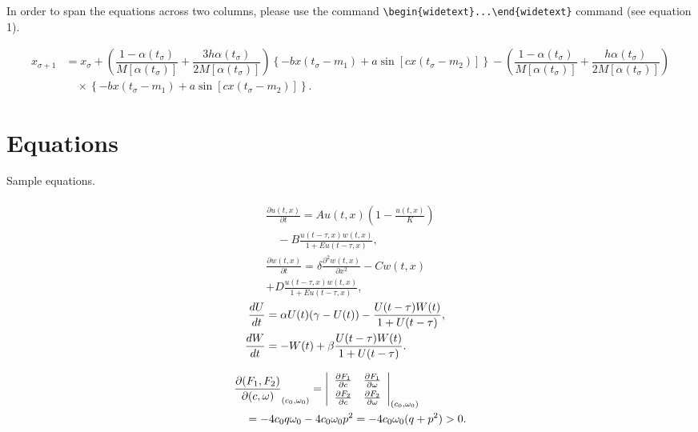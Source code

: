 \documentclass[vruler,JEB]{COB}%
\begin{document}
In order to span the equations across two columns, please use the command
\verb+\begin{widetext}...\end{widetext}+ command (see equation 1).

\begin{widetext}
\begin{align} \label{d24} x_{\sigma+1} &= x_{\sigma} + \left( \dfrac{1-\alpha(t_\sigma)}{M[\alpha(t_\sigma)]} + \dfrac{3h\alpha(t_\sigma)}{2M[\alpha(t_\sigma)]} \right)  \left\{-bx(t_\sigma-m_1) + a \sin [cx(t_\sigma-m_2)]\right\}  - \left( \dfrac{1-\alpha(t_\sigma)}{M[\alpha(t_\sigma)]} + \dfrac{h \alpha(t_\sigma)}{2M[\alpha(t_\sigma)]}\right)\nonumber\\ &\quad\times \left\{-bx(t_\sigma-m_1) + a \sin [cx(t_\sigma-m_2)]\right\}. \end{align}
\end{widetext}


\section{Equations}

Sample equations.

\begin{align}\label{1.1}
\begin{split}
\frac{\partial u(t,x)}{\partial t} = Au(t,x) \left(1-\frac{u(t,x)}{K}\right)\\
\quad -B\frac{u(t-\tau,x) w(t,x)}{1+Eu(t-\tau,x)},\\
\frac{\partial w(t,x)}{\partial t} =\delta \frac{\partial^2w(t,x)}{\partial x^2}-Cw(t,x)\\
+D\frac{u(t-\tau,x)w(t,x)}{1+Eu(t-\tau,x)},
\end{split}
\end{align}


\begin{align}\label{1.2}
\begin{split}
\notag\\[-26pt]\frac{dU}{dt} &=\alpha U(t)(\gamma -U(t))-\frac{U(t-\tau)W(t)}{1+U(t-\tau)},\\
\frac{dW}{dt} &=-W(t)+\beta\frac{U(t-\tau)W(t)}{1+U(t-\tau)}.
\end{split}
\end{align}


\begin{align*}
&\frac{\partial(F_1,F_2)}{\partial(c,\omega)}_{(c_0,\omega_0)} = \left|
\begin{array}{ll}
\frac{\partial F_1}{\partial c} &\frac{\partial F_1}{\partial \omega} \\\noalign{\vskip3pt}
\frac{\partial F_2}{\partial c}&\frac{\partial F_2}{\partial \omega}
\end{array}\right|_{(c_0,\omega_0)}\\
&\quad=-4c_0q\omega_0 -4c_0\omega_0p^2 =-4c_0\omega_0(q+p^2)>0.
\end{align*}
\end{document}
